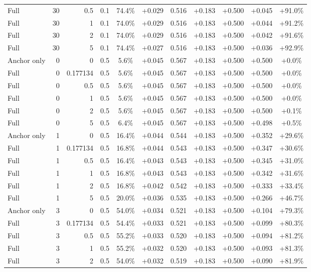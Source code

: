 \begin{table}[htbp]
\begin{tabular}{lrrrccccccc}
Full & 30 & 0.5 & 0.1 & 74.4\% & +0.029 & 0.516 & +0.183 & +0.500 & +0.045 & +91.0\% \\
Full & 30 & 1 & 0.1 & 74.0\% & +0.029 & 0.516 & +0.183 & +0.500 & +0.044 & +91.2\% \\
Full & 30 & 2 & 0.1 & 74.0\% & +0.029 & 0.516 & +0.183 & +0.500 & +0.042 & +91.6\% \\
Full & 30 & 5 & 0.1 & 74.4\% & +0.027 & 0.516 & +0.183 & +0.500 & +0.036 & +92.9\% \\
Anchor only & 0 & 0 & 0.5 & 5.6\% & +0.045 & 0.567 & +0.183 & +0.500 & +0.500 & +0.0\% \\
Full & 0 & 0.177134 & 0.5 & 5.6\% & +0.045 & 0.567 & +0.183 & +0.500 & +0.500 & +0.0\% \\
Full & 0 & 0.5 & 0.5 & 5.6\% & +0.045 & 0.567 & +0.183 & +0.500 & +0.500 & +0.0\% \\
Full & 0 & 1 & 0.5 & 5.6\% & +0.045 & 0.567 & +0.183 & +0.500 & +0.500 & +0.0\% \\
Full & 0 & 2 & 0.5 & 5.6\% & +0.045 & 0.567 & +0.183 & +0.500 & +0.500 & +0.1\% \\
Full & 0 & 5 & 0.5 & 6.4\% & +0.045 & 0.567 & +0.183 & +0.500 & +0.498 & +0.5\% \\
Anchor only & 1 & 0 & 0.5 & 16.4\% & +0.044 & 0.544 & +0.183 & +0.500 & +0.352 & +29.6\% \\
Full & 1 & 0.177134 & 0.5 & 16.8\% & +0.044 & 0.543 & +0.183 & +0.500 & +0.347 & +30.6\% \\
Full & 1 & 0.5 & 0.5 & 16.4\% & +0.043 & 0.543 & +0.183 & +0.500 & +0.345 & +31.0\% \\
Full & 1 & 1 & 0.5 & 16.8\% & +0.043 & 0.543 & +0.183 & +0.500 & +0.342 & +31.6\% \\
Full & 1 & 2 & 0.5 & 16.8\% & +0.042 & 0.542 & +0.183 & +0.500 & +0.333 & +33.4\% \\
Full & 1 & 5 & 0.5 & 20.0\% & +0.036 & 0.535 & +0.183 & +0.500 & +0.266 & +46.7\% \\
Anchor only & 3 & 0 & 0.5 & 54.0\% & +0.034 & 0.521 & +0.183 & +0.500 & +0.104 & +79.3\% \\
Full & 3 & 0.177134 & 0.5 & 54.4\% & +0.033 & 0.521 & +0.183 & +0.500 & +0.099 & +80.3\% \\
Full & 3 & 0.5 & 0.5 & 55.2\% & +0.033 & 0.520 & +0.183 & +0.500 & +0.094 & +81.2\% \\
Full & 3 & 1 & 0.5 & 55.2\% & +0.032 & 0.520 & +0.183 & +0.500 & +0.093 & +81.3\% \\
Full & 3 & 2 & 0.5 & 54.0\% & +0.032 & 0.519 & +0.183 & +0.500 & +0.090 & +81.9\% \\

\end{tabular}
\end{table}
